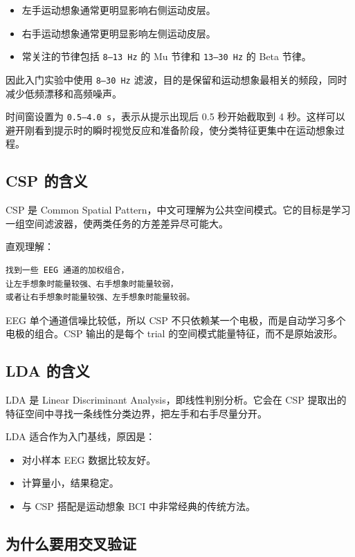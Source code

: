 \documentclass[UTF8,a4paper,12pt]{ctexart}
\begin{document}
\begin{itemize}
  \item 左手运动想象通常更明显影响右侧运动皮层。
  \item 右手运动想象通常更明显影响左侧运动皮层。
  \item 常关注的节律包括 \texttt{8--13 Hz} 的 Mu 节律和 \texttt{13--30 Hz} 的 Beta 节律。
\end{itemize}

因此入门实验中使用 \texttt{8--30 Hz} 滤波，目的是保留和运动想象最相关的频段，同时减少低频漂移和高频噪声。

时间窗设置为 \texttt{0.5--4.0 s}，表示从提示出现后 0.5 秒开始截取到 4 秒。这样可以避开刚看到提示时的瞬时视觉反应和准备阶段，使分类特征更集中在运动想象过程。

\subsection{CSP 的含义}

CSP 是 Common Spatial Pattern，中文可理解为公共空间模式。它的目标是学习一组空间滤波器，使两类任务的方差差异尽可能大。

直观理解：

\begin{lstlisting}[language={}]
找到一些 EEG 通道的加权组合，
让左手想象时能量较强、右手想象时能量较弱，
或者让右手想象时能量较强、左手想象时能量较弱。
\end{lstlisting}

EEG 单个通道信噪比较低，所以 CSP 不只依赖某一个电极，而是自动学习多个电极的组合。CSP 输出的是每个 trial 的空间模式能量特征，而不是原始波形。

\subsection{LDA 的含义}

LDA 是 Linear Discriminant Analysis，即线性判别分析。它会在 CSP 提取出的特征空间中寻找一条线性分类边界，把左手和右手尽量分开。

LDA 适合作为入门基线，原因是：

\begin{itemize}
  \item 对小样本 EEG 数据比较友好。
  \item 计算量小，结果稳定。
  \item 与 CSP 搭配是运动想象 BCI 中非常经典的传统方法。
\end{itemize}

\subsection{为什么要用交叉验证}
\end{document}
